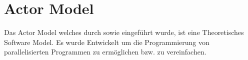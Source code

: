 \chapter{Actor Model}
Das Actor Model welches durch \cite{hewitt1973session} sowie \cite{Agha1985Actors:Systems.} eingeführt wurde, ist eine Theoretisches Software Model. Es wurde Entwickelt um die Programmierung von parallelisierten Programmen zu ermöglichen bzw. zu vereinfachen. 